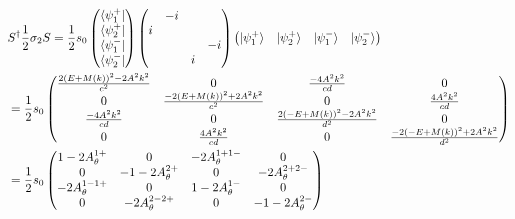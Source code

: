 \documentclass[22pt]{article}
\begin{document}
\begin{normalsize}
\begin{align}
	&S^{\dagger}\frac{1}{2}\sigma_2S=\frac{1}{2}s_0
	\begin{pmatrix}
			\bra{\psi_{1}^{+}}\\
			\bra{\psi_{2}^{+}}\\
			\bra{\psi_{1}^{-}}\\
			\bra{\psi_{2}^{-}}
	\end{pmatrix}
\begin{pmatrix}
	&-i&&\\
	i&&&\\
	&&&-i\\
	&&i&
\end{pmatrix}
\begin{pmatrix}
			\ket{\psi_{1}^{+}} &\ket{\psi_{2}^{+}} &
			\ket{\psi_{1}^{-}}&\ket{\psi_{2}^{-}}
\end{pmatrix}\\ \nonumber
&=\frac{1}{2}s_0
\begin{pmatrix}
	\frac{2(E+M(k))^2-2A^2k^2}{c^2} &0 & \frac{-4A^2k^2}{cd} &0	\\
	0&\frac{-2(E+M(k))^2+2A^2k^2}{c^2} &0 &\frac{4A^2k^2}{cd} \\
	\frac{-4A^2k^2}{cd} &0 &\frac{2(-E+M(k))^2-2A^2k^2}{d^2} &0\\
	0&\frac{4A^2k^2}{cd} &0 &\frac{-2(-E+M(k))^2+2A^2k^2}{d^2}
\end{pmatrix}\\
&=\frac{1}{2}s_0
\begin{pmatrix}
	1-2A_{\theta}^{1+}  &0 &-2A_{\theta}^{1+1-}&0\\
	0&-1-2A_{\theta}^{2+}&0&-2A_{\theta}^{2+2-}\\
	-2A_{\theta}^{1-1+} &0 &1-2A_{\theta}^{1-}&0\\
	0&-2A_{\theta}^{2-2+} &0 &-1-2A_{\theta}^{2-}
\end{pmatrix}
\end{align}
\end{normalsize}
\end{document}
